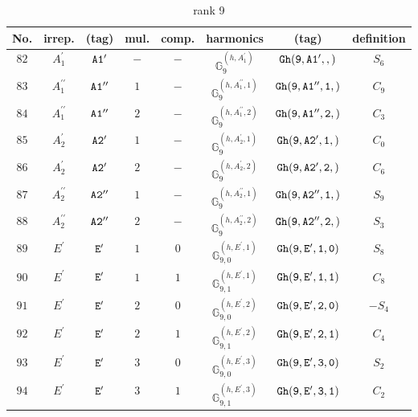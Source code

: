 \documentclass[fleqn,8pt]{jsarticle}
\begin{document}
\begin{table}[ht!]
\begin{center}
\caption{rank 9}
\renewcommand{\arraystretch}{1.3}
\begin{tabular}{cccccccc} \hline \hline
No. & irrep. & (tag) & mul. & comp. & harmonics & (tag) & definition \\ \hline
$ 82 $ & $ A_{1}^{\prime} $ & $ {\tt A1'} $ & $ - $ & $ - $ & $ \mathbb{G}_{9}^{(h,A_{1}^{\prime})} $ & $ {\tt Gh(9,A1',,)} $ & $ S_{6} $ \\
$ 83 $ & $ A_{1}^{\prime\prime} $ & $ {\tt A1''} $ & $ 1 $ & $ - $ & $ \mathbb{G}_{9}^{(h,A_{1}^{\prime\prime},1)} $ & $ {\tt Gh(9,A1'',1,)} $ & $ C_{9} $ \\
$ 84 $ & $ A_{1}^{\prime\prime} $ & $ {\tt A1''} $ & $ 2 $ & $ - $ & $ \mathbb{G}_{9}^{(h,A_{1}^{\prime\prime},2)} $ & $ {\tt Gh(9,A1'',2,)} $ & $ C_{3} $ \\
$ 85 $ & $ A_{2}^{\prime} $ & $ {\tt A2'} $ & $ 1 $ & $ - $ & $ \mathbb{G}_{9}^{(h,A_{2}^{\prime},1)} $ & $ {\tt Gh(9,A2',1,)} $ & $ C_{0} $ \\
$ 86 $ & $ A_{2}^{\prime} $ & $ {\tt A2'} $ & $ 2 $ & $ - $ & $ \mathbb{G}_{9}^{(h,A_{2}^{\prime},2)} $ & $ {\tt Gh(9,A2',2,)} $ & $ C_{6} $ \\
$ 87 $ & $ A_{2}^{\prime\prime} $ & $ {\tt A2''} $ & $ 1 $ & $ - $ & $ \mathbb{G}_{9}^{(h,A_{2}^{\prime\prime},1)} $ & $ {\tt Gh(9,A2'',1,)} $ & $ S_{9} $ \\
$ 88 $ & $ A_{2}^{\prime\prime} $ & $ {\tt A2''} $ & $ 2 $ & $ - $ & $ \mathbb{G}_{9}^{(h,A_{2}^{\prime\prime},2)} $ & $ {\tt Gh(9,A2'',2,)} $ & $ S_{3} $ \\
$ 89 $ & $ E^{\prime} $ & $ {\tt E'} $ & $ 1 $ & $ 0 $ & $ \mathbb{G}_{9,0}^{(h,E^{\prime},1)} $ & $ {\tt Gh(9,E',1,0)} $ & $ S_{8} $ \\
$ 90 $ & $ E^{\prime} $ & $ {\tt E'} $ & $ 1 $ & $ 1 $ & $ \mathbb{G}_{9,1}^{(h,E^{\prime},1)} $ & $ {\tt Gh(9,E',1,1)} $ & $ C_{8} $ \\
$ 91 $ & $ E^{\prime} $ & $ {\tt E'} $ & $ 2 $ & $ 0 $ & $ \mathbb{G}_{9,0}^{(h,E^{\prime},2)} $ & $ {\tt Gh(9,E',2,0)} $ & $ - S_{4} $ \\
$ 92 $ & $ E^{\prime} $ & $ {\tt E'} $ & $ 2 $ & $ 1 $ & $ \mathbb{G}_{9,1}^{(h,E^{\prime},2)} $ & $ {\tt Gh(9,E',2,1)} $ & $ C_{4} $ \\
$ 93 $ & $ E^{\prime} $ & $ {\tt E'} $ & $ 3 $ & $ 0 $ & $ \mathbb{G}_{9,0}^{(h,E^{\prime},3)} $ & $ {\tt Gh(9,E',3,0)} $ & $ S_{2} $ \\
$ 94 $ & $ E^{\prime} $ & $ {\tt E'} $ & $ 3 $ & $ 1 $ & $ \mathbb{G}_{9,1}^{(h,E^{\prime},3)} $ & $ {\tt Gh(9,E',3,1)} $ & $ C_{2} $ \\

\end{tabular}
\end{center}
\end{table}
\end{document}
